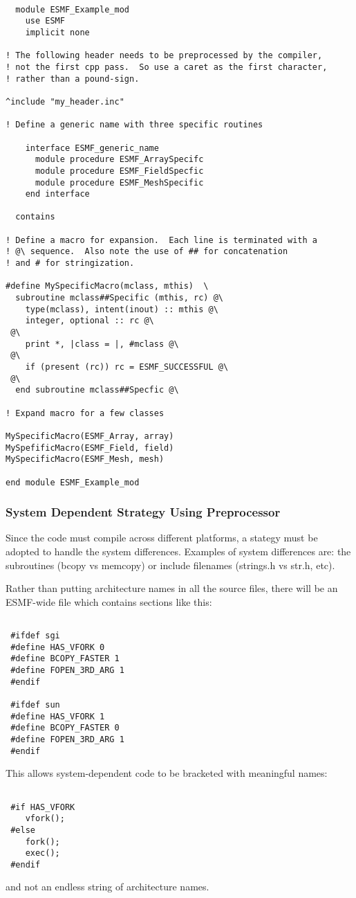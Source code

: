 \begin{verbatim}

  module ESMF_Example_mod
    use ESMF
    implicit none

! The following header needs to be preprocessed by the compiler,
! not the first cpp pass.  So use a caret as the first character,
! rather than a pound-sign.

^include "my_header.inc"

! Define a generic name with three specific routines

    interface ESMF_generic_name
      module procedure ESMF_ArraySpecifc
      module procedure ESMF_FieldSpecfic
      module procedure ESMF_MeshSpecific
    end interface

  contains

! Define a macro for expansion.  Each line is terminated with a
! @\ sequence.  Also note the use of ## for concatenation
! and # for stringization.

#define MySpecificMacro(mclass, mthis)  \
  subroutine mclass##Specific (mthis, rc) @\
    type(mclass), intent(inout) :: mthis @\
    integer, optional :: rc @\
 @\
    print *, |class = |, #mclass @\
 @\
    if (present (rc)) rc = ESMF_SUCCESSFUL @\
 @\
  end subroutine mclass##Specfic @\

! Expand macro for a few classes

MySpecificMacro(ESMF_Array, array)
MySpefificMacro(ESMF_Field, field)
MySpecificMacro(ESMF_Mesh, mesh)

end module ESMF_Example_mod

\end{verbatim}

\subsubsection{System Dependent Strategy Using Preprocessor} Since the code
must compile across different platforms, a stategy must be adopted to
handle the system differences. Examples of system differences are: the
subroutines (bcopy vs memcopy) or include filenames (strings.h vs str.h,
etc).

Rather than putting architecture names in all the source files, there will
be an ESMF-wide file which contains sections like this: 
\begin{verbatim}

 #ifdef sgi 
 #define HAS_VFORK 0 
 #define BCOPY_FASTER 1 
 #define FOPEN_3RD_ARG 1 
 #endif

 #ifdef sun 
 #define HAS_VFORK 1 
 #define BCOPY_FASTER 0 
 #define FOPEN_3RD_ARG 1 
 #endif

\end{verbatim} This allows system-dependent code to be bracketed with
meaningful names: 

\begin{verbatim} 

 #if HAS_VFORK
    vfork();
 #else
    fork(); 
    exec();
 #endif

\end{verbatim} 
and not an endless string of architecture names.

